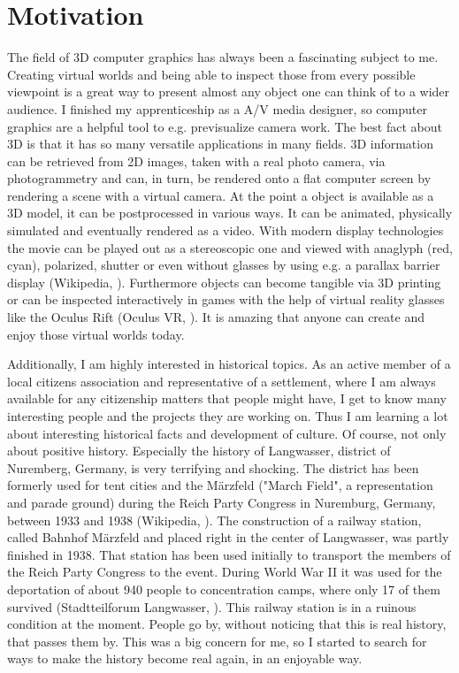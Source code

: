 \section{Motivation}

The field of 3D computer graphics has always been a fascinating subject to me. Creating virtual worlds and being able to inspect those from every possible viewpoint is a great way to present almost any object one can think of to a wider audience. I finished my apprenticeship as a A/V media designer, so computer graphics are a helpful tool to e.g. previsualize camera work. The best fact about 3D is that it has so many versatile applications in many fields. 3D information can be retrieved from 2D images, taken with a real photo camera, via photogrammetry and can, in turn, be rendered onto a flat computer screen by rendering a scene with a virtual camera. At the point a object is available as a 3D model, it can be postprocessed in various ways. It can be animated, physically simulated and eventually rendered as a video. With modern display technologies the movie can be played out as a stereoscopic one and viewed with anaglyph (red, cyan), polarized, shutter or even without glasses by using e.g. a parallax barrier display (Wikipedia, \parencite{wiki:ParallaxBarrier}). Furthermore objects can become tangible via 3D printing or can be inspected interactively in games with the help of virtual reality glasses like the Oculus Rift (Oculus VR, \parencite{OculusVR}). It is amazing that anyone can create and enjoy those virtual worlds today.

Additionally, I am highly interested in historical topics. As an active member of a local citizens association and representative of a settlement, where I am always available for any citizenship matters that people might have, I get to know many interesting people and the projects they are working on. Thus I am learning a lot about interesting historical facts and development of culture. Of course, not only about positive history. Especially the history of Langwasser, district of Nuremberg, Germany, is very terrifying and shocking. The district has been formerly used for tent cities and the Märzfeld ("March Field", a representation and parade ground) during the Reich Party Congress in Nuremburg, Germany, between 1933 and 1938 (Wikipedia, \parencite{wiki:NaziPartyRallyGround}). The construction of a railway station, called Bahnhof Märzfeld and placed right in the center of Langwasser, was partly finished in 1938. That station has been used initially to transport the members of the Reich Party Congress to the event. During World War II it was used for the deportation of about 940 people to concentration camps, where only 17 of them survived (Stadtteilforum Langwasser, \parencite{StadtteilforumTafel6}). This railway station is in a ruinous condition at the moment. People go by, without noticing that this is real history, that passes them by. This was a big concern for me, so I started to search for ways to make the history become real again, in an enjoyable way.

